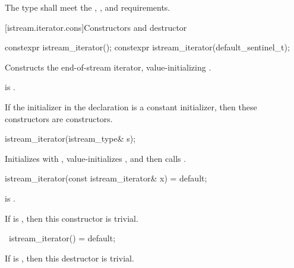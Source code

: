 \pnum
The type  shall meet the ,
, and  requirements.

[istream.iterator.cons]{Constructors and destructor}

%
\begin{itemdecl}
constexpr istream_iterator();
constexpr istream_iterator(default_sentinel_t);
\end{itemdecl}

\begin{itemdescr}
\pnum
\effects
Constructs the end-of-stream iterator, value-initializing .

\pnum
\ensures
{} is .

\pnum
\remarks
If the initializer  in the declaration 
is a constant initializer,
then these constructors are  constructors.
\end{itemdescr}


%
\begin{itemdecl}
istream_iterator(istream_type& s);
\end{itemdecl}

\begin{itemdescr}
\pnum
\effects
Initializes  with ,
value-initializes ,
and then calls .
\end{itemdescr}


%
\begin{itemdecl}
istream_iterator(const istream_iterator& x) = default;
\end{itemdecl}

\begin{itemdescr}
\pnum
\ensures
{} is .

\pnum
\remarks
If  is ,
then this constructor is trivial.
\end{itemdescr}

%
\begin{itemdecl}
~istream_iterator() = default;
\end{itemdecl}

\begin{itemdescr}
\pnum
\remarks
If  is ,
then this destructor is trivial.
\end{itemdescr}

